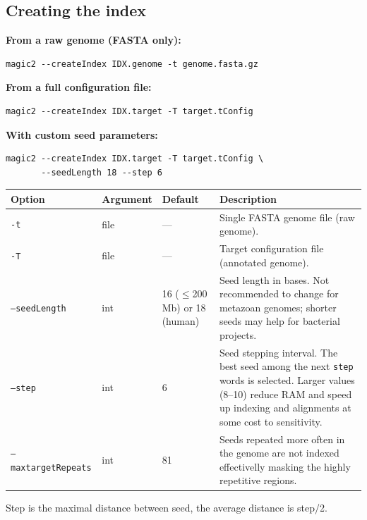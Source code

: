 \documentclass[11pt]{article}
\newcommand{\code}[1]{\texttt{#1}}
\begin{document}
\subsection{Creating the index}

\textbf{From a raw genome (FASTA only):}
\begin{lstlisting}
magic2 --createIndex IDX.genome -t genome.fasta.gz
\end{lstlisting}

\textbf{From a full configuration file:}
\begin{lstlisting}
magic2 --createIndex IDX.target -T target.tConfig
\end{lstlisting}

\textbf{With custom seed parameters:}
\begin{lstlisting}
magic2 --createIndex IDX.target -T target.tConfig \
       --seedLength 18 --step 6
\end{lstlisting}

\begin{center}
\begin{tabular}{lll p{6.5cm}}
\toprule
\textbf{Option} & \textbf{Argument} & \textbf{Default} & \textbf{Description} \\
\midrule
\code{-t}            & file & ---  & Single FASTA genome file (raw genome). \\
\code{-T}            & file & ---  & Target configuration file (annotated genome). \\
\code{--seedLength}  & int  & 16 (\(\leq\)200 Mb) or 18 (human)
                     & Seed length in bases.  Not recommended to change for
                       metazoan genomes; shorter seeds may help for
                       bacterial projects. \\
\code{--step}        & int  & 6
                     & Seed stepping interval.  The best seed among the next
                       \code{step} words is selected.  Larger values (8--10)
                       reduce RAM and speed up indexing and alignments
                       at some cost to sensitivity. \\
\code{--maxtargetRepeats}  &int & 81 & Seeds repeated more often in the genome are not indexed effectivelly masking the highly repetitive regions.\\                        
\bottomrule
\end{tabular}
\end{center}
Step is the maximal distance between seed, the average distance is step/2.
\end{document}
